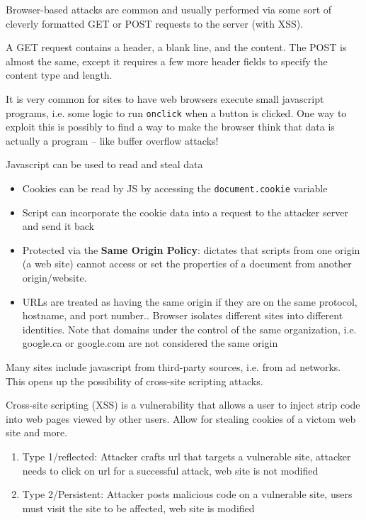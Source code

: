 \documentclass[../notes.tex]{subfiles}
\begin{document}
Browser-based attacks are common and usually performed via some sort of cleverly formatted GET or POST requests to the server (with XSS).

A GET request contains a header, a blank line, and the content. The POST is almost the same, except it requires a few more header fields to specify the content type and length.


It is very common for sites to have web browsers execute small javascript programs, i.e. some logic to run \texttt{onclick} when a button is clicked.
One way to exploit this is possibly to find a way to make the browser think that data is actually a program -- like buffer overflow attacks!





Javascript can be used to read and steal data
\begin{itemize}
    \item Cookies can be read by JS by accessing the \texttt{document.cookie} variable
    \item Script can incorporate the cookie data into a request to the attacker server and send it back
    \item Protected via the \textbf{Same Origin Policy}: dictates that scripts from one origin (a web site) cannot access or set the properties of a document from another origin/website. 
    \item URLs are treated as having the same origin if they are on the same protocol, hostname, and port number.. Browser isolates different sites into different identities. Note that domains under the control of the same organization, i.e. google.ca or google.com are not considered the same origin
\end{itemize}

Many sites include javascript from third-party sources, i.e. from ad networks. This opens up the possibility of cross-site scripting attacks.

\begin{definition}
    Cross-site scripting (XSS) is a vulnerability that allows a user to inject strip code into web pages viewed by other users. Allow for stealing cookies of a victom web site and more.

    \begin{enumerate}
        \item  Type 1/reflected: Attacker crafts url that targets a vulnerable site, attacker needs to click on url for a successful attack, web site is not modified
        \item   Type 2/Persistent: Attacker posts malicious code on a vulnerable site, users must visit the site to be affected, web site is modified
    \end{enumerate}
\end{definition}
\end{document}

